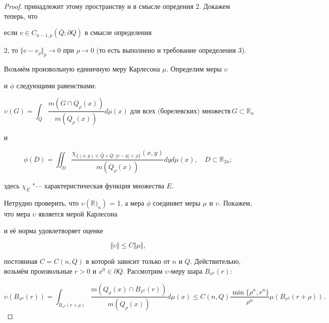 \begin{proof}
принадлежит этому пространству и в смысле опредения 2. Докажем теперь, что

если $v \in C_{n-1,p}(\bar {Q} ; \partial Q)$ в смысле определения

2, то $\Vert v - v _{\rho}\Vert_p \to 0$ при $\rho \to 0$ (то есть выполнено и требование определения 3).



Возьмём произвольную единичную меру Карлесона $\mu$. Определим меры $\upsilon$

и $\phi$ следующими равенствами:

$$

\upsilon (G) = \int_{\bar {Q}} \frac{m(G \cap Q_{\rho}(x))}{m(Q_{\rho}(x))}

d\mu (x) \; \mbox{для всех (борелевских) множеств} \, G \subset {\mathbb R}_n $$

и 

$$

\phi (D) = \iint_{D} \frac{\chi_{\{ (x,y)\in \bar {Q} \times \bar {Q}:

|x-y|<\rho\}}(x, y)}{m(Q_{\rho}(x))} dy d\mu (x), \quad  D \subset {\mathbb R}_{2n};

$$

здесь $\chi_E$ "--- характеристическая функция множества $E$.



Нетрудно проверить, что $\upsilon({\mathbb  R)}_n)$ = 1, а мера $\phi$ соединяет меры $\mu$ и $\upsilon$. Покажем, что мера $\upsilon$ является мерой Карлесона

и её норма удовлетворяет оценке

\begin{equation}

\Vert\upsilon\Vert \leq C \Vert\mu\Vert, 

\label{gu:16}

\end{equation}

постоянная $C = C(n,Q)$ в которой зависит только от $n$ и $Q$. Действительно, возьмём произвольные $r > 0$ и $x^0 \in \partial Q$. Рассмотрим $\upsilon$-меру шара $B_{x^0}(r)$:

$$

\upsilon (B_{x^0}(r)) = \!\!\int_{B_{x^0}(r+\rho)} \!\!\frac{m(Q_{\rho}(x)

\cap B_{x^0}(r))}{m(Q_{\rho}(x))}d\mu(x)\leq C(n,Q) \frac{\min\{\rho^n, r^n\}}{\rho^n}

\mu (B_{x^0}(r + \rho)).

$$


\end{proof}
